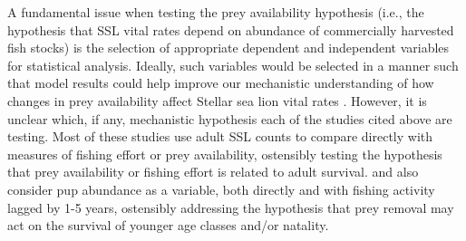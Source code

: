 \documentclass[11pt]{article}
\begin{document}
A fundamental issue when testing the prey availability hypothesis (i.e., the hypothesis that SSL vital rates depend on abundance of commercially harvested fish stocks) is the selection of appropriate dependent and independent variables for statistical analysis.  Ideally, such variables would be selected in a manner such that model results could help improve our mechanistic understanding of how changes in prey availability affect Stellar sea lion vital rates \citep{FayPunt2006,Wolf:2008qf}. However, it is unclear which, if any, mechanistic hypothesis each of the studies cited above are testing.  Most of these studies use adult SSL counts to compare directly with measures of fishing effort or prey availability, ostensibly testing the hypothesis that prey availability or fishing effort is related to adult survival. \citet{Loughlin:1989kl} and \citet{Ferrero:1994hc} also consider pup abundance as a variable, both directly and with fishing activity lagged by 1-5 years, ostensibly addressing the hypothesis that prey removal may act on the survival of younger age classes and/or natality.
\end{document}
